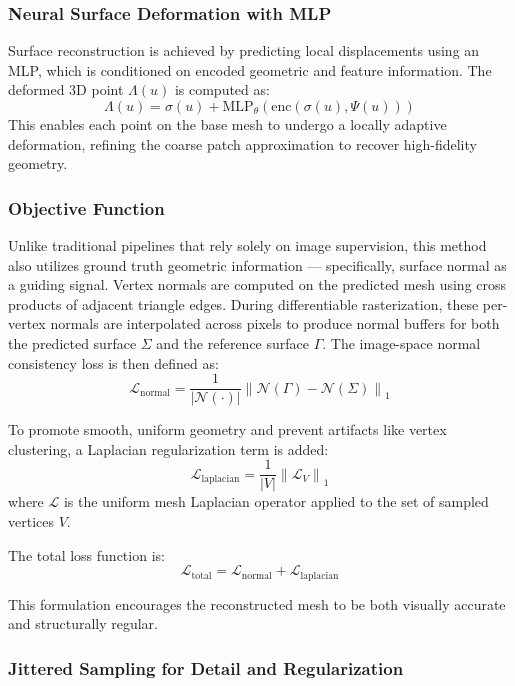 \subsubsection{Neural Surface Deformation with MLP}

Surface reconstruction is achieved by predicting local displacements using an MLP, which is conditioned on encoded geometric and feature information.
The deformed 3D point $\Lambda(u)$ is computed as:
\[\Lambda(u) = \sigma(u) + \text{MLP}_{\theta}(\text{enc}(\sigma(u), \Psi(u)))\]
This enables each point on the base mesh to undergo a locally adaptive deformation, refining the coarse patch approximation to recover high-fidelity geometry.





\subsubsection{Objective Function}

Unlike traditional pipelines that rely solely on image supervision, this method also utilizes ground truth geometric information — specifically, surface normal as a guiding signal.
Vertex normals are computed on the predicted mesh using cross products of adjacent triangle edges.
During differentiable rasterization, these per-vertex normals are interpolated across pixels to produce normal buffers for both the predicted surface $\Sigma$ and the reference surface $\Gamma$.
The image-space normal consistency loss is then defined as:
\[\mathcal{L}_{\text{normal}} = \frac{1}{|\mathcal{N}(\cdot)|} \left\| \mathcal{N}(\Gamma) - \mathcal{N}(\Sigma) \right\|_1\]

To promote smooth, uniform geometry and prevent artifacts like vertex clustering, a Laplacian regularization term is added:
\[\mathcal{L}_{\text{laplacian}} = \frac{1}{|V|} \left\| \mathcal{L}_V \right\|_1\]
where $\mathcal{L}$ is the uniform mesh Laplacian operator applied to the set of sampled vertices $V$.

The total loss function is:
\[\mathcal{L}_{\text{total}} = \mathcal{L}_{\text{normal}} + \mathcal{L}_{\text{laplacian}}\]

This formulation encourages the reconstructed mesh to be both visually accurate and structurally regular.





\subsubsection{Jittered Sampling for Detail and Regularization}

